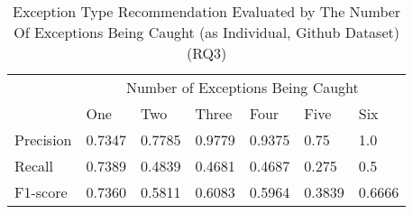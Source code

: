\begin{table}[t]%
  \caption{Exception Type Recommendation Evaluated by The Number Of Exceptions Being Caught (\xtype as Individual, Github Dataset) (RQ3)}
  \vspace{-12pt}
  \small
	\begin{center}
		\renewcommand{\arraystretch}{1}
		\begin{tabular}{| p{1.2cm}<{\centering} | p{0.8cm}<{\centering} | p{0.8cm}<{\centering}| p{0.8cm}<{\centering} | p{0.8cm}<{\centering} | p{0.8cm}<{\centering} | p{0.8cm}<{\centering} |}
		  \hline
			\multirow{2}{*}{} & \multicolumn{6}{c|}{Number of Exceptions Being Caught} \\
			\cline{2-7}
			  & One & Two & Three & Four & Five & Six\\
			\hline
			Precision &  0.7347 & 0.7785 & 0.9779 & 0.9375 & 0.75 & 1.0\\
			\hline
			Recall &  0.7389 & 0.4839 & 0.4681 & 0.4687 & 0.275 & 0.5\\
			\hline
			F1-score &  0.7360 & 0.5811 & 0.6083 & 0.5964 & 0.3839 & 0.6666\\
			\hline
		\end{tabular}
		\label{tab:r3-xtype-1}
	\end{center}
\end{table}
